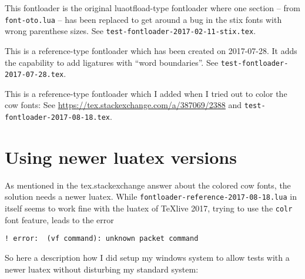 \documentclass[parskip=half-,egregdoesnotlikesansseriftitles]{scrartcl}
\begin{document}
\begin{description}[font=\texttt]
  \item[fontloader-2017-02-11-stix.lua] This fontloader is the original luaotfload-type fontloader where one section  -- from \texttt{font-oto.lua} -- has been replaced to get around a bug in the stix fonts with wrong parenthese sizes. See \texttt{test-fontloader-2017-02-11-stix.tex}.

  \item[*fontloader-reference-2017-07-28.lua] This is a reference-type fontloader which has been created on 2017-07-28. It adds the capability to add ligatures with \enquote{word boundaries}. See \texttt{test-fontloader-2017-07-28.tex}.
  
  \item[*fontloader-reference-2017-08-18.lua] This is a reference-type fontloader which I added when I tried out to color the cow fonts: See \url{https://tex.stackexchange.com/a/387069/2388}  and 
      \texttt{test-fontloader-2017-08-18.tex}.
      
\end{description}


\section{Using newer luatex versions}

As mentioned in the tex.stackexchange answer about the colored cow fonts, the solution needs a newer luatex. While \texttt{fontloader-reference-2017-08-18.lua} in itself seems to work fine with the luatex of TeXlive 2017, trying to use the \texttt{colr} font feature, leads to the error

  \verb+! error:  (vf command): unknown packet command+ 
  
So here a description how I did setup my windows system to allow tests with a newer luatex without disturbing my standard system:
\end{document}
